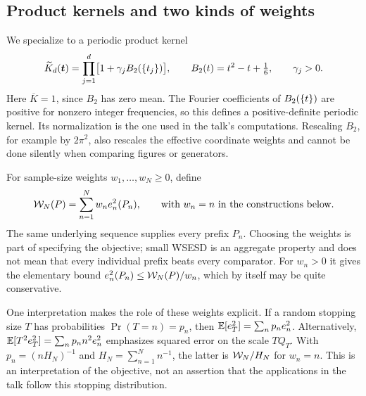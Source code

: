 \subsection{Product kernels and two kinds of weights}
We specialize to a periodic product kernel
\begin{equation}\label{eq:kernel}
 \widetilde K_d(\boldsymbol t)=\prod_{j=1}^d
 \bigl[1+\gamma_j B_2(\{t_j\})\bigr],
 \qquad B_2(t)=t^2-t+\tfrac16,
 \qquad \gamma_j>0.
\end{equation}
Here $\overline K=1$, since $B_2$ has zero mean. The Fourier coefficients
of $B_2(\{t\})$ are positive for nonzero integer frequencies, so
this defines a positive-definite periodic kernel. Its normalization is the
one used in the talk's computations. Rescaling $B_2$, for example by
$2\pi^2$, also rescales the effective coordinate weights and cannot be done
silently when comparing figures or generators.

For sample-size weights $w_1,\ldots,w_N\ge0$, define
\begin{equation}\label{eq:wesd}
 \mathcal W_N(P)=\sum_{n=1}^N w_n e_n^2(P_n),
 \qquad\text{with }w_n=n\text{ in the constructions below}.
\end{equation}
The same underlying sequence supplies every prefix $P_n$. Choosing the
weights is part of specifying the objective; small WSESD is an aggregate
property and does not mean that every individual prefix beats every
comparator. For $w_n>0$ it gives the elementary bound
$e_n^2(P_n)\le\mathcal W_N(P)/w_n$, which by itself may be quite conservative.

One interpretation makes the role of these weights explicit. If a random
stopping size $T$ has probabilities $\Pr(T=n)=p_n$, then
$\mathbb{E}[e_T^2]=\sum_n p_n e_n^2$. Alternatively,
$\mathbb{E}[T^2e_T^2]=\sum_n p_n n^2 e_n^2$ emphasizes squared error on the
scale $TQ_T$. With $p_n=(nH_N)^{-1}$ and
$H_N=\sum_{n=1}^N n^{-1}$, the latter is $\mathcal W_N/H_N$ for $w_n=n$.
This is an interpretation of the objective, not an assertion that the
applications in the talk follow this stopping distribution.

\par\smallskip
\noindent{}
\par\smallskip
